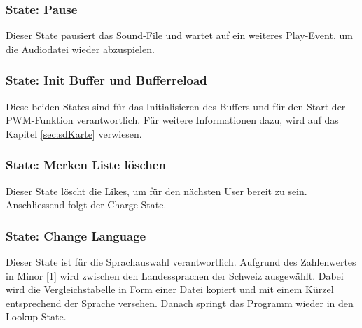 \subsubsection*{State: Pause}

Dieser State pausiert das Sound-File und wartet auf ein weiteres Play-Event, um die Audiodatei wieder abzuspielen.

\subsubsection*{State: Init Buffer und Bufferreload}
Diese beiden States sind für das Initialisieren des Buffers und für den Start der PWM-Funktion verantwortlich. Für weitere Informationen dazu, wird auf das Kapitel \ref{sec:sdKarte} verwiesen.

\subsubsection*{State: Merken Liste löschen}

Dieser State löscht die Likes, um für den nächsten User bereit zu sein. Anschliessend folgt der Charge State.

\subsubsection*{State: Change Language}

Dieser State ist für die Sprachauswahl verantwortlich. Aufgrund des Zahlenwertes in Minor [1] wird zwischen den Landessprachen der Schweiz ausgewählt. Dabei wird die Vergleichstabelle in Form einer Datei kopiert und mit einem Kürzel entsprechend der Sprache versehen. Danach springt das Programm wieder in den Lookup-State.

